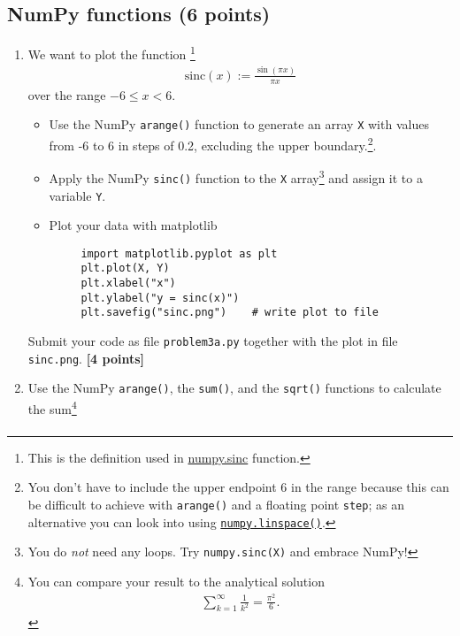 \documentclass[letterpaper]{scrartcl}
\newcounter{TotalPoints}
\newcommand{\points}[1]{\textbf{[#1 points]}\stepcounter{TotalPoints}}
\newenvironment{enuma}{\begin{enumerate}[label=(\alph*)]}{\end{enumerate}}
\begin{document}
\subsection{NumPy functions (6 points)}
\label{sec:numpyfuncs}

\begin{enuma}
\item We want to plot the function \footnote{This is the definition
    used in
    \href{https://docs.scipy.org/doc/numpy/reference/generated/numpy.sinc.html}{numpy.sinc}
    function.}
  \begin{gather}
    \label{eq:sinc}
    \text{sinc}(x) := \frac{\sin(\pi x)}{\pi x}
  \end{gather}
  over the range $-6 \leq x < 6$.
  \begin{itemize}
  \item Use the NumPy \texttt{arange()} function to generate an array
    \texttt{X} with values from -6 to 6 in steps of 0.2, excluding the
    upper boundary.\footnote{You don't have to include the upper
      endpoint 6 in the range because this can be difficult to achieve
      with \texttt{arange()} and a floating point \texttt{step}; as an
      alternative you can look into using
      \href{https://docs.scipy.org/doc/numpy/reference/generated/numpy.linspace.html}{\texttt{numpy.linspace()}}.}.
  \item Apply the NumPy \texttt{sinc()} function to the \texttt{X}
    array\footnote{You do \emph{not} need any loops. Try
      \texttt{numpy.sinc(X)} and embrace NumPy!}
    and assign it to a variable \texttt{Y}.
  \item Plot your data with matplotlib
     \begin{verbatim}
     import matplotlib.pyplot as plt
     plt.plot(X, Y)
     plt.xlabel("x")
     plt.ylabel("y = sinc(x)")
     plt.savefig("sinc.png")    # write plot to file
     \end{verbatim}
  \end{itemize}
  Submit your code as file \texttt{problem3a.py} together with the
  plot in file \texttt{sinc.png}. \points{4}
\item \label{li:zeta2}Use the NumPy \texttt{arange()}, the \texttt{sum()}, and the
  \texttt{sqrt()} functions to calculate the sum\footnote{You can
    compare your result to the analytical solution
    \begin{gather*}
      \sum_{k=1}^{\infty} \frac{1}{k^{2}} = \frac{\pi^{2}}{6}.
    \end{gather*}
  }
  \begin{gather}

\end{gather}
\end{enuma}
\end{document}
